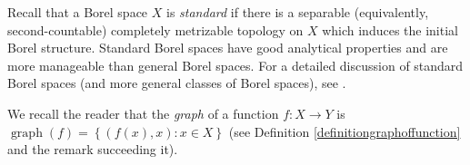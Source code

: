 




Recall that a Borel space $X$ is \emph{standard} if there is a separable (equivalently, second-countable) completely metrizable topology on $X$ which induces the initial Borel structure. Standard Borel spaces have good analytical properties and are more manageable than general Borel spaces. For a detailed discussion of standard Borel spaces (and more general classes of Borel spaces), see \cite{MR1321597}.

We recall the reader that the \emph{graph} of a function $f:X\to Y$ is $\operatorname{graph}(f)=\left\{(f(x),x):x\in X\right\}$ (see Definition \ref{definitiongraphoffunction} and the remark succeeding it).

